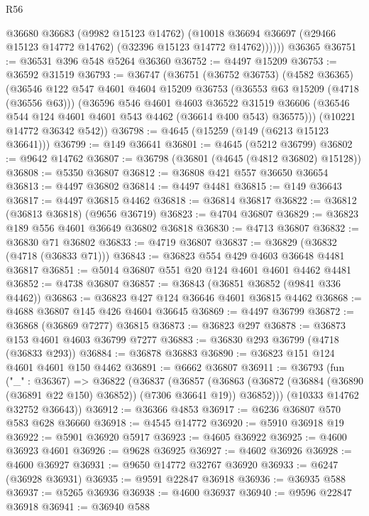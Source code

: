 \begin{lexlean}{R56}
\begin{coremodule}
            @36680
            @36683
            (@9982 @15123 @14762)
            (@10018 @36694 @36697 (@29466 @15123 @14772 @14762) (@32396 @15123 @14772 @14762))))))
    @36365
@36751 := @36531 @396 @548 @5264 @36360
@36752 := @4497 @15209
@36753 := @36592 @31519
@36793 := @36747
    (@36751
      (@36752 @36753)
      (@4582 @36365)
      (@36546
        @122
        @547
        @4601
        @4604
        @15209
        @36753
        (@36553 @63 @15209 (@4718 (@36556 @63)))
        (@36596
          @546
          @4601
          @4603
          @36522
          @31519
          @36606
          (@36546 @544 @124 @4601 @4601 @543 @4462 (@36614 @400 @543) @36575)))
      (@10221 @14772 @36342 @542))
@36798 := @4645 (@15259 (@149 (@6213 @15123 @36641)))
@36799 := @149 @36641
@36801 := @4645 (@5212 @36799)
@36802 := @9642 @14762
@36807 := @36798 (@36801 (@4645 (@4812 @36802) @15128))
@36808 := @5350 @36807
@36812 := @36808 @421 @557 @36650 @36654
@36813 := @4497 @36802
@36814 := @4497 @4481
@36815 := @149 @36643
@36817 := @4497 @36815 @4462
@36818 := @36814 @36817
@36822 := @36812 (@36813 @36818) (@9656 @36719)
@36823 := @4704 @36807
@36829 := @36823 @189 @556 @4601 @36649 @36802 @36818
@36830 := @4713 @36807
@36832 := @36830 @71 @36802
@36833 := @4719 @36807
@36837 := @36829 (@36832 (@4718 (@36833 @71)))
@36843 := @36823 @554 @429 @4603 @36648 @4481 @36817
@36851 := @5014 @36807 @551 @20 @124 @4601 @4601 @4462 @4481
@36852 := @4738 @36807
@36857 := @36843 (@36851 @36852 (@9841 @336 @4462))
@36863 := @36823 @427 @124 @36646 @4601 @36815 @4462
@36868 := @4688 @36807 @145 @426 @4604 @36645
@36869 := @4497 @36799
@36872 := @36868 (@36869 @7277) @36815
@36873 := @36823 @297
@36878 := @36873 @153 @4601 @4603 @36799 @7277
@36883 := @36830 @293 @36799 (@4718 (@36833 @293))
@36884 := @36878 @36883
@36890 := @36823 @151 @124 @4601 @4601 @150 @4462
@36891 := @6662 @36807
@36911 := @36793
    (fun ("_" : @36367) =>
    @36822
      (@36837
        (@36857
          (@36863 (@36872 (@36884 (@36890 (@36891 @22 @150) @36852)) (@7306 @36641 @19)) @36852)))
      (@10333 @14762 @32752 @36643))
@36912 := @36366 @4853
@36917 := @6236 @36807 @570 @583 @628 @36660
@36918 := @4545 @14772
@36920 := @5910 @36918 @19
@36922 := @5901 @36920 @5917
@36923 := @4605 @36922
@36925 := @4600 @36923 @4601
@36926 := @9628 @36925
@36927 := @4602 @36926
@36928 := @4600 @36927
@36931 := @9650 @14772 @32767 @36920
@36933 := @6247 (@36928 @36931)
@36935 := @9591 @22847 @36918
@36936 := @36935 @588
@36937 := @5265 @36936
@36938 := @4600 @36937
@36940 := @9596 @22847 @36918
@36941 := @36940 @588

\end{coremodule}
\end{lexlean}
